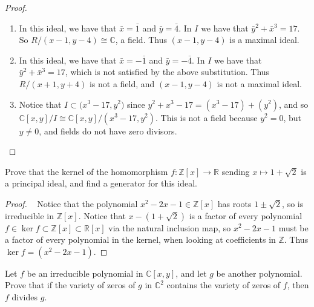 \documentclass{article}
\newenvironment{problem}[2][Problem]{\begin{trivlist}
\item[\hskip \labelsep {\bfseries #1}\hskip \labelsep {\bfseries #2.}]}{\end{trivlist}}
\newcommand{\fn}[3]{#1 \colon #2 \rightarrow #3}
\begin{document}
\begin{proof} ~
  \begin{enumerate}
    \item In this ideal, we have that $\bar x = \bar 1$ and $\bar y = \bar 4$.
      In $I$ we have that $\bar y^2 + \bar x^3 = 17$.
      So $R/(x - 1, y - 4) \cong \mathbb C$, a field. Thus $(x - 1, y - 4)$ is a
      maximal ideal.
    \item In this ideal, we have that $\bar x = -\bar 1$ and $\bar y = -\bar 4$.
      In $I$ we have that $\bar y^2 + \bar x^3 = 17$, which is not satisfied by
      the above substitution. Thus $R/(x + 1, y + 4)$ is not a field, and
      $(x - 1, y - 4)$ is not a maximal ideal.
    \item Notice that $I \subset \mathbb (x^3 - 17, y^2)$ since
    $y^2 + x^3 - 17 = (x^3 - 17) + (y^2)$, and so
    $\mathbb C[x, y]/I \cong \mathbb C[x, y]/(x^3 - 17, y^2)$. This is not a
    field because $y^2 = 0$, but $y \neq 0$, and fields do not have zero
    divisors.
  \end{enumerate}
\end{proof}
\pagebreak
\begin{problem}{6 (Artin)}
  Prove that the kernel of the homomorphism $\fn f {\mathbb Z[x]}{\mathbb R}$
  sending $x \mapsto 1 + \sqrt 2$ is a principal ideal, and find a generator
  for this ideal.
\end{problem}

\begin{proof} ~
  Notice that the polynomial $x^2 - 2x - 1 \in \mathbb Z[x]$ has roots
  $1 \pm \sqrt 2$, so is irreducible in $\mathbb Z[x]$.
  Notice that $x - (1 + \sqrt2)$ is a factor of every polynomial
  $f \in \ker f \subset \mathbb Z[x] \subset \mathbb R[x]$ via the natural
  inclusion map, so $x^2 - 2x - 1$ must be a factor of every polynomial in the
  kernel, when looking at coefficients in $\mathbb Z$.
  Thus $\ker f = (x^2 - 2x - 1)$.
\end{proof}
\begin{problem}{7 (Artin)}
  Let $f$ be an irreducible polynomial in $\mathbb C[x, y]$, and let $g$ be
  another polynomial. Prove that if the variety of zeros of $g$ in $\mathbb C^2$
  contains the variety of zeros of $f$, then $f$ divides $g$.
\end{problem}
\end{document}
